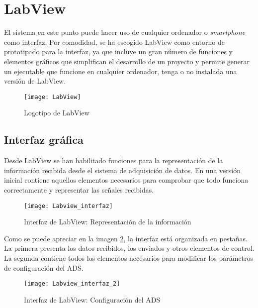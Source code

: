 \clearpage

\section{LabView\label{sec:Software_Labview}}

El sistema en este punto puede hacer uso de cualquier ordenador o \textit{smartphone} como interfaz. Por comodidad, se ha escogido LabView como entorno de prototipado para la interfaz, ya que incluye un gran número de funciones y elementos gráficos que simplifican el desarrollo de un proyecto y permite generar un ejecutable que funcione en cualquier ordenador, tenga o no instalada una versión de LabView.

\begin{figure} [h]
    \centering
    \texttt{[image: LabView]}
    \caption{Logotipo de LabView}
    \label{fig:LabView}
\end{figure}

\subsection{Interfaz gráfica\label{sec:Software_Labview_interfaz}}

Desde LabView se han habilitado funciones para la representación de la información recibida desde el sistema de adquisición de datos. En una versión inicial contiene aquellos elementos necesarios para comprobar que todo funciona correctamente y representar las señales recibidas.

\begin{figure} [h]
    \centering
    \texttt{[image: Labview\_interfaz]}
    \caption{Interfaz de LabView: Representación de la información}
    \label{fig:Labview_interfaz}
\end{figure}

Como se puede apreciar en la imagen \ref{fig:Labview_interfaz}, la interfaz está organizada en pestañas.\\
La primera presenta los datos recibidos, los enviados y otros elementos de control.\\
La segunda contiene todos los elementos necesarios para modificar los parámetros de configuración del ADS.

\begin{figure} [h]
    \centering
    \texttt{[image: Labview\_interfaz\_2]}
    \caption{Interfaz de LabView: Configuración del ADS}
    \label{fig:Labview_interfaz_2}
\end{figure}

